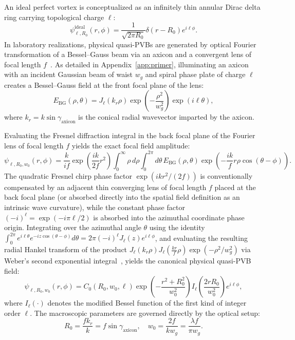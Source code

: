 \documentclass{optica-article}
\begin{document}
An ideal perfect vortex is conceptualized as an infinitely thin annular Dirac delta ring carrying topological charge $\ell$:
\begin{equation}
\psi_{\ell, R_0}^{\text{ideal}}(r, \phi) = \frac{1}{\sqrt{2\pi R_0}} \delta(r - R_0) e^{i \ell \phi}.
\label{eq:ideal_pvb}
\end{equation}
In laboratory realizations, physical quasi-PVBs are generated by optical Fourier transformation of a Bessel--Gauss beam via an axicon and a convergent lens of focal length $f$~\cite{Vaity2015}. As detailed in Appendix~\ref{app:primer}, illuminating an axicon with an incident Gaussian beam of waist $w_g$ and spiral phase plate of charge $\ell$ creates a Bessel--Gauss field at the front focal plane of the lens:
\begin{equation}
E_{\text{BG}}(\rho, \theta) = J_\ell(k_r \rho) \exp\left( -\frac{\rho^2}{w_g^2} \right) \exp(i \ell \theta),
\label{eq:bg_field}
\end{equation}
where $k_r = k \sin \gamma_{\text{axicon}}$ is the conical radial wavevector imparted by the axicon.

Evaluating the Fresnel diffraction integral in the back focal plane of the Fourier lens of focal length $f$ yields the exact focal field amplitude:
\begin{equation}
\psi_{\ell, R_0, w_0}(r, \phi) = \frac{k}{i f} \exp\left( \frac{i k}{2f} r^2 \right) \int_0^\infty \rho \, d\rho \int_0^{2\pi} d\theta \, E_{\text{BG}}(\rho, \theta) \exp\left( - \frac{i k}{f} r \rho \cos(\theta - \phi) \right).
\label{eq:fresnel_integral_focal}
\end{equation}
The quadratic Fresnel chirp phase factor $\exp(i k r^2 / (2f))$ is conventionally compensated by an adjacent thin converging lens of focal length $f$ placed at the back focal plane (or absorbed directly into the spatial field definition as an intrinsic wave curvature), while the constant phase factor $(-i)^\ell = \exp(-i \pi \ell / 2)$ is absorbed into the azimuthal coordinate phase origin. Integrating over the azimuthal angle $\theta$ using the identity $\int_0^{2\pi} e^{i \ell \theta} e^{-i z \cos(\theta - \phi)} d\theta = 2\pi (-i)^\ell J_\ell(z) e^{i \ell \phi}$, and evaluating the resulting radial Hankel transform of the product $J_\ell(k_r \rho) J_\ell(\frac{k r}{f} \rho) \exp(-\rho^2 / w_g^2)$ via Weber's second exponential integral~\cite{Gradshteyn2014}, yields the canonical physical quasi-PVB field:
\begin{equation}
\psi_{\ell, R_0, w_0}(r, \phi) = C_0(R_0, w_0, \ell) \exp\left( - \frac{r^2 + R_0^2}{w_0^2} \right) I_\ell\left( \frac{2 r R_0}{w_0^2} \right) e^{i \ell \phi},
\label{eq:pvb_field}
\end{equation}
where $I_\ell(\cdot)$ denotes the modified Bessel function of the first kind of integer order $\ell$. The macroscopic parameters are governed directly by the optical setup:
\begin{equation}
R_0 = \frac{f k_r}{k} = f \sin \gamma_{\text{axicon}}, \quad w_0 = \frac{2 f}{k w_g} = \frac{\lambda f}{\pi w_g}.
\label{eq:r0_w0_parameters}
\end{equation}
\end{document}
